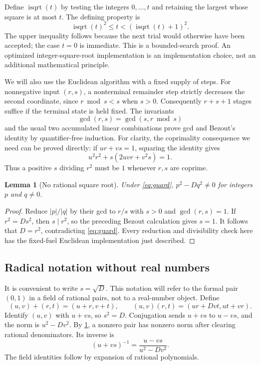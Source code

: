 \documentclass[11pt,letterpaper]{article}
\newtheorem{lemma}[theorem]{Lemma}
\theoremstyle{definition}
\newcommand{\isqrt}{\operatorname{isqrt}}
\newcommand{\abs}[1]{\lvert#1\rvert}
\begin{document}
Define $\isqrt(t)$ by testing the integers $0,\ldots,t$ and retaining the
largest whose square is at most $t$. The defining property is
\begin{equation}\label{eq:isqrt}
 \isqrt(t)^2\le t<(\isqrt(t)+1)^2.
\end{equation}
The upper inequality follows because the next trial would otherwise have
been accepted; the case $t=0$ is immediate. This is a bounded-search proof.
An optimized integer-square-root implementation is an implementation choice,
not an additional mathematical principle.

We will also use the Euclidean algorithm with a fixed supply of steps.
For nonnegative input $(r,s)$, a nonterminal remainder step strictly decreases
the second coordinate, since $r\bmod s<s$ when $s>0$.
Consequently $r+s+1$ stages suffice if the
terminal state is held fixed. The invariants
\[
 \gcd(r,s)=\gcd(s,r\bmod s)
\]
and the usual two accumulated linear combinations prove gcd and Bezout's
identity by quantifier-free induction. For clarity, the coprimality
consequence we need can be proved directly: if $ur+vs=1$, squaring the
identity gives
\[
 u^2r^2+s(2uvr+v^2s)=1.
\]
Thus a positive $s$ dividing $r^2$ must be $1$ whenever $r,s$ are coprime.

\begin{lemma}[No rational square root]\label{lem:irrational}
Under \eqref{eq:guard}, $p^2-Dq^2\ne0$ for integers $p$ and $q\ne0$.
\end{lemma}
\begin{proof}
Reduce $\abs p/\abs q$ by their gcd to $r/s$ with $s>0$ and
$\gcd(r,s)=1$. If $r^2=Ds^2$, then $s\mid r^2$, so the preceding Bezout
calculation gives $s=1$. It follows that $D=r^2$, contradicting
\eqref{eq:guard}. Every reduction and divisibility check here has the
fixed-fuel Euclidean implementation just described.
\end{proof}

\subsection{Radical notation without real numbers}\label{sec:quadraticorder}

It is convenient to write $s=\sqrt D$. This notation will refer to the
formal pair $(0,1)$ in a field of rational pairs, not to a real-number object.
Define
\[
 (u,v)+(r,t)=(u+r,v+t),\qquad
 (u,v)(r,t)=(ur+Dvt,ut+vr).
\]
Identify $(u,v)$ with $u+vs$, so $s^2=D$. Conjugation sends $u+vs$ to
$u-vs$, and the norm is $u^2-Dv^2$. By \cref{lem:irrational}, a nonzero
pair has nonzero norm after clearing rational denominators. Its inverse is
\[
 (u+vs)^{-1}=\frac{u-vs}{u^2-Dv^2}.
\]
The field identities follow by expansion of rational polynomials.
\end{document}
